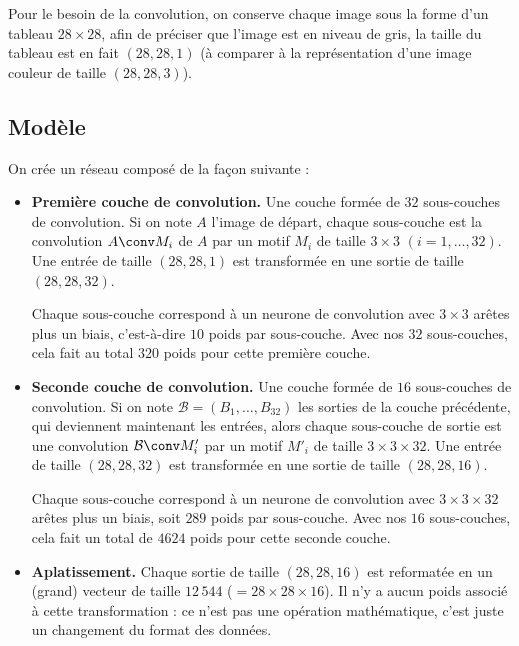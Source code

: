 \documentclass[11pt,class=report,crop=false]{standalone}
\begin{document}
Pour le besoin de la convolution, on conserve chaque image sous la forme d'un tableau $28\times 28$, afin de préciser que l'image est en niveau de gris, la taille du tableau \numpy{} est en fait $(28, 28, 1)$ (à comparer à la représentation d'une image couleur de taille $(28, 28, 3)$).

\subsection{Modèle}

On crée un réseau composé de la façon suivante :
\begin{itemize}
  \item \textbf{Première couche de convolution.} 
  Une couche formée de $32$ sous-couches de convolution. Si on note $A$ l'image de départ, chaque sous-couche est la convolution $A \conv M_i$ de $A$ par un motif $M_i$ de taille $3 \times 3$ $(i=1,\ldots,32)$. Une entrée de taille $(28,28,1)$ est transformée en une sortie de taille $(28,28,32)$.
   
  Chaque sous-couche correspond à un neurone de convolution avec $3 \times 3$ arêtes plus un biais, c'est-à-dire $10$ poids par sous-couche. Avec nos $32$ sous-couches, cela fait au total $320$ poids pour cette première couche. 
  
  
  
  \item \textbf{Seconde couche de convolution.}
  Une couche formée de $16$ sous-couches de convolution. Si on note $\mathcal{B} = (B_1,\ldots,B_{32})$ les sorties de la couche précédente, qui deviennent maintenant les entrées, alors chaque sous-couche de sortie est une convolution $\mathcal{B} \conv M'_i$ par un motif $M'_i$ de taille $3 \times 3 \times 32$. Une entrée de taille $(28,28,32)$ est transformée en une sortie de taille $(28,28,16)$.
  
  Chaque sous-couche correspond à un neurone de convolution avec $3 \times 3 \times 32$ arêtes plus un biais, soit $289$ poids par sous-couche. Avec nos $16$ sous-couches, cela fait un total de $4 624$ poids pour cette seconde couche.
  
  
  \item \textbf{Aplatissement.}
  Chaque sortie de taille  $(28,28,16)$ est reformatée en un (grand) vecteur de taille $12\,544$ ($= 28 \times 28 \times 16$). Il n'y a aucun poids associé à cette transformation : ce n'est pas une opération mathématique, c'est juste un changement du format des données.
  

\end{itemize}
\end{document}
